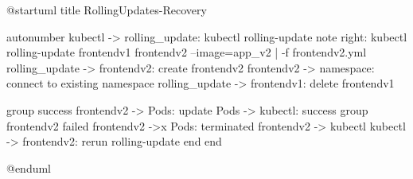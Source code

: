 @startuml
title RollingUpdates-Recovery

autonumber
kubectl -> rolling_update: kubectl rolling-update
note right: kubectl rolling-update frontendv1 frontendv2 --image=app_v2 | -f frontendv2.yml
rolling_update -> frontendv2: create frontendv2
frontendv2 -> namespace: connect to existing namespace
rolling_update -> frontendv1: delete frontendv1

group success
  frontendv2 -> Pods: update
  Pods -> kubectl: success
  group frontendv2 failed
    frontendv2 ->x Pods: terminated
    frontendv2 -> kubectl
    kubectl -> frontendv2: rerun rolling-update
    end
end

@enduml
